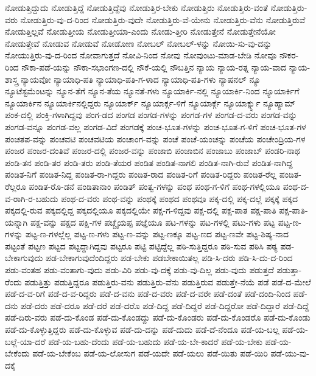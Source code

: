 {ನೋಡುತ್ತಿದ್ದುದು
ನೋಡುತ್ತಿದ್ದೆ
ನೋಡುತ್ತಿದ್ದೆವು
ನೋಡುತ್ತಿರ-ಬೇಕು
ನೋಡುತ್ತಿರು
ನೋಡುತ್ತಿರು-ವಂತೆ
ನೋಡುತ್ತಿರು-ವರು
ನೋಡುತ್ತಿರು-ವು-ದ-ರಿಂದ
ನೋಡುತ್ತಿರು-ವುದೇ
ನೋಡುತ್ತಿರು-ವೆ-ಯೇನು
ನೋಡುತ್ತಿರು-ವೆನು
ನೋಡುತ್ತಿರುವೆ
ನೋಡುತ್ತಿಲ್ಲವೆ
ನೋಡುತ್ತೀಯ
ನೋಡುತ್ತೀಯಾ-ಎಂದು
ನೋಡು-ತ್ತೀರಿ
ನೋಡುತ್ತೇನೆ
ನೋಡುತ್ತೇನೆಯೋ
ನೋಡುತ್ತೇವೆ
ನೋಡುವ
ನೋಡುವೆ
ನೋಡೋಣ
ನೋಬಲ್
ನೋಬಲ್-ಳನ್ನು
ನೋಯಿ-ಸು-ವು-ದನ್ನು
ನೋಯುತ್ತಿರು-ವು-ದ-ರಿಂದ
ನೋವಾಗುತ್ತದೆ
ನೋವಿ-ನಿಂದ
ನೋವು
ನೋವುಂಟು-ಮಾಡ-ಬೇಡಿ
ನೋವೂ
ನೌಕರ-ರಿಂದ
ನೌಕಾ-ಪಡೆ-ಯನ್ನು
ನೌಕಾ-ಸಭಾಂಗಣ-ದಲ್ಲಿ
ನೌಕೆ-ಯಲ್ಲಿ
ನೌಬತ್ತಿನ
ನ್ಯಾಯ
ನ್ಯಾಯ-ರತ್ನ
ನ್ಯಾಯ-ವಾದ
ನ್ಯಾಯ-ಶಾಸ್ತ್ರ
ನ್ಯಾಯವೋ
ನ್ಯಾಯಾಧಿ-ಪತಿ
ನ್ಯಾಯಾಧಿ-ಪತಿ-ಗ-ಳಾದ
ನ್ಯಾಯಾಧಿ-ಪತಿ-ಗಳು
ನ್ಯಾಷನಲ್
ನ್ಯೂ
ನ್ಯೂಟೆಸ್ಟಮೆಂಟನ್ನು
ನ್ಯೂನ-ತೆಗೆ
ನ್ಯೂನ-ತೆಯ
ನ್ಯೂನತೆ-ಗಳು
ನ್ಯೂಯಾರ್ಕಿ-ನಲ್ಲಿ
ನ್ಯೂಯಾರ್ಕಿ-ನಿಂದ
ನ್ಯೂಯಾರ್ಕಿಗೆ
ನ್ಯೂಯಾರ್ಕಿನ
ನ್ಯೂಯಾರ್ಕಿನಲ್ಲಿದ್ದರು
ನ್ಯೂಯಾರ್ಕ್
ನ್ಯೂಯಾರ್ಕ್ಗ-ಳಿಗೆ
ನ್ಯೂಯಾರ್ಕ್ಗೆ
ನ್ಯೂಯಾರ್ಕ್ನ್ನು
ನ್ಯೂಹ್ಯಾಮ್
ಪಂಕ-ದಲ್ಲಿ
ಪಂಕ್ತಿ-ಗಳಾಗಿದ್ದವು
ಪಂಗ-ಡದ
ಪಂಗಡ
ಪಂಗಡ-ಗಳನ್ನು
ಪಂಗಡ-ಗಳ
ಪಂಗಡ-ದ-ವರು
ಪಂಗಡ-ವನ್ನು
ಪಂಗಡ-ವನ್ನೂ
ಪಂಗಡ-ವಲ್ಲ
ಪಂಗಡ-ವಿದೆ
ಪಂಗಡಕ್ಕೆ
ಪಂಚ-ಭೂತ-ಗಳನ್ನು
ಪಂಚ-ಭೂತ-ಗ-ಳಿಗೆ
ಪಂಚ-ಭೂತ-ಗಳ
ಪಂಚತಪ-ವನ್ನು
ಪಂಚವಟಿ
ಪಂಚವಟಿಯ
ಪಂಚಾಂಗ-ವನ್ನು
ಪಂಚೆ
ಪಂಚೆ-ಯಂಚನ್ನು
ಪಂಚೆಯ
ಪಂಚೇಂದ್ರಿಯ-ಗಳ
ಪಂಜರ
ಪಂಜರ-ದಂತಿವೆ
ಪಂಜರ-ದಲ್ಲಿ
ಪಂಜರ-ವನ್ನು
ಪಂಜಾಬಿ
ಪಂಜಾಬಿನ
ಪಂಜಾಬು
ಪಂಜಾಬ್
ಪಂಡರಿ-ನಾಥ
ಪಂಡಿ-ತನ
ಪಂಡಿ-ತರ
ಪಂಡಿ-ತರು
ಪಂಡಿ-ತೆಯರ
ಪಂಡಿತ
ಪಂಡಿತ-ನಾಗಲಿ
ಪಂಡಿತ-ನಾಗಿ-ರುವೆ
ಪಂಡಿತ-ನಾಗಿದ್ದ
ಪಂಡಿತ-ನಿಗೆ
ಪಂಡಿತ-ನಿದ್ದ
ಪಂಡಿತ-ರಾ-ಗಿದ್ದರು
ಪಂಡಿತ-ರಾದ
ಪಂಡಿತ-ರಿಗೆ
ಪಂಡಿತ-ರಿದ್ದರು
ಪಂಡಿತ-ರೆಲ್ಲ
ಪಂಡಿತ-ರೆಲ್ಲರೂ
ಪಂಡಿತ-ರೊ-ಡನೆ
ಪಂಡಿತಾನಾಂ
ಪಂಡಿತ್
ಪಂತ್ವ-ಗಳನ್ನು
ಪಂಥ
ಪಂಥ-ಗ-ಳಿಗೆ
ಪಂಥ-ಗಳಲ್ಲಿಯೂ
ಪಂಥ-ದ-ವ-ರಾಗಿ-ರ-ಬಹುದು
ಪಂಥ-ದ-ವರು
ಪಂಥ-ವನ್ನು
ಪಂಥಕ್ಕೆ
ಪಂಥದ
ಪಂಥವೂ
ಪಕ್ಕ-ದಲ್ಲಿ
ಪಕ್ಕ-ದಲ್ಲೆ
ಪಕ್ಕಕ್ಕೆ
ಪಕ್ಕದ
ಪಕ್ಕದಲ್ಲಿ-ರುವ
ಪಕ್ಕದಲ್ಲಿದ್ದ
ಪಕ್ಕದಲ್ಲಿಯೂ
ಪಕ್ಕದಲ್ಲಿಯೇ
ಪಕ್ಷ-ಗ-ಳಿದ್ದವು
ಪಕ್ಷ-ದಲ್ಲಿ
ಪಕ್ಷ-ಪಾತ
ಪಕ್ಷ-ಪಾತಿ
ಪಕ್ಷ-ಪಾತಿ-ಯನ್ನಾಗಿ
ಪಕ್ಷ-ವನ್ನು
ಪಕ್ಷದ
ಪಕ್ಷಿ-ಗಳ
ಪಚ್ಚೈಯಪ್ಪ
ಪಜ್ಞೆಯೂ
ಪಟ-ಗಳನ್ನು
ಪಟ-ಗಳಲ್ಲಿ
ಪಟು-ಗಳು
ಪಟ್ಟ
ಪಟ್ಟ-ಣ-ಗಳನ್ನು
ಪಟ್ಟ-ಣ-ಗಳಲ್ಲೆಲ್ಲ
ಪಟ್ಟ-ಣ-ಗಳು
ಪಟ್ಟ-ಣ-ವನ್ನು
ಪಟ್ಟ-ಣಕ್ಕೂ
ಪಟ್ಟ-ಣದ
ಪಟ್ಟ-ಣವೇ
ಪಟ್ಟ-ಶಿಷ್ಯ-ನಾದ
ಪಟ್ಟಂತೆ
ಪಟ್ಟಣ
ಪಟ್ಟದ
ಪಟ್ಟದ್ದಾಗಿದ್ದವು
ಪಟ್ಟರೂ
ಪಟ್ಟಿ
ಪಟ್ಟಿದ್ದೆಲ್ಲ
ಪಠಿ-ಸುತ್ತಿದ್ದರೂ
ಪಠಿ-ಸುವ
ಪಠಿಸಿ
ಪಠ್ಯ
ಪಡ-ಬೇಕಾಗುವುದು
ಪಡ-ಬೇಕಾಗುವುದೆಂದಿದ್ದರು
ಪಡ-ಬೇಕು
ಪಡಬೇಕಾಯಿತಲ್ಲ
ಪಡಿ-ಸಿ-ದರು
ಪಡಿ-ಸಿ-ದು-ದ-ರಿಂದ
ಪಡು-ವಂತಹ
ಪಡು-ವಂತಾಗು-ವುದು
ಪಡು-ವಿರಿ
ಪಡು-ವು-ದಕ್ಕೆ
ಪಡು-ವು-ದಿಲ್ಲ
ಪಡು-ವುದು
ಪಡುತ್ತದೆ
ಪಡುತ್ತಾ-ರೆಂದು
ಪಡುತ್ತಿತ್ತು
ಪಡುತ್ತಿದ್ದರೂ
ಪಡುತ್ತಿರು-ವನು
ಪಡುತ್ತಿರು-ವೆನು
ಪಡುತ್ತಿರುವ
ಪಡುತ್ತೇ-ನೆಯೆ
ಪಡೆ
ಪಡೆ-ದ-ಮೇಲೆ
ಪಡೆ-ದ-ವ-ರಿಗೆ
ಪಡೆ-ದ-ವ-ರಿದ್ದರು
ಪಡೆ-ದ-ವನು
ಪಡೆ-ದ-ವರು
ಪಡೆ-ದ-ವರೇ
ಪಡೆ-ದಂತೆ
ಪಡೆ-ದಂದಿ-ನಿಂದ
ಪಡೆ-ದನು
ಪಡೆ-ದರು
ಪಡೆ-ದರೂ
ಪಡೆ-ದರೆ
ಪಡೆ-ದರೊ
ಪಡೆ-ದಿದ್ದ
ಪಡೆ-ದಿದ್ದರೆ
ಪಡೆ-ದಿದ್ದರೋ
ಪಡೆ-ದಿದ್ದಾರೆ
ಪಡೆ-ದಿದ್ದೆ
ಪಡೆ-ದಿರು-ವರು
ಪಡೆ-ದು-ಕೊಂಡ
ಪಡೆ-ದು-ಕೊಂಡದ್ದು
ಪಡೆ-ದು-ಕೊಂಡರು
ಪಡೆ-ದು-ಕೊಂಡರೊ
ಪಡೆ-ದು-ಕೊಂಡು
ಪಡೆ-ದು-ಕೊಳ್ಳುತ್ತಿದ್ದರು
ಪಡೆ-ದು-ಕೊಳ್ಳುವ
ಪಡೆ-ದು-ದನ್ನು
ಪಡೆ-ದುದು
ಪಡೆ-ದೆ-ನೆಂದೂ
ಪಡೆ-ಯ-ಬಲ್ಲ
ಪಡೆ-ಯ-ಬಲ್ಲೆ-ಯಾ-ದರೆ
ಪಡೆ-ಯ-ಬಹು-ದೆಂದು
ಪಡೆ-ಯ-ಬಹುದು
ಪಡೆ-ಯ-ಬೇ-ಕಾದರೆ
ಪಡೆ-ಯ-ಬೇಕು
ಪಡೆ-ಯ-ಬೇಕೆಂದು
ಪಡೆ-ಯ-ಬೇಕೆಂಬ
ಪಡೆ-ಯ-ಲೋಸುಗ
ಪಡೆ-ಯದೇ
ಪಡೆ-ಯಲು
ಪಡೆ-ಯಿತು
ಪಡೆ-ಯಿರಿ
ಪಡೆ-ಯು-ವು-ದಕ್ಕೆ
}
